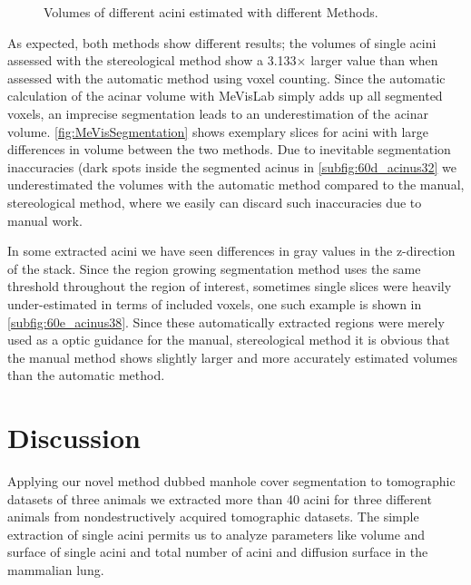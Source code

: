 \documentclass[twoside,paper=a4,abstract=true,english,DIV=calc]{scrartcl}
\newcommand{\difference}{3.133} %
\begin{document}
\begin{figure}[htb]
	\caption{Volumes of different acini estimated with different Methods.}
	\label{fig:VolumeMeVisVsSTEPanizer}%
\end{figure}

As expected, both methods show different results; the volumes of single acini assessed with the stereological method show a \difference\(\times\) larger value than when assessed with the automatic method using voxel counting. Since the automatic calculation of the acinar volume with MeVisLab simply adds up all segmented voxels, an imprecise segmentation leads to an underestimation of the acinar volume. \autoref{fig:MeVisSegmentation} shows exemplary slices for acini with large differences in volume between the two methods. Due to inevitable segmentation inaccuracies (dark spots inside the segmented acinus in \autoref{subfig:60d_acinus32} we underestimated the volumes with the automatic method compared to the manual, stereological method, where we easily can discard such inaccuracies due to manual work.

In some extracted acini we have seen differences in gray values in the z-direction of the stack. Since the region growing segmentation method uses the same threshold throughout the region of interest, sometimes single slices were heavily under-estimated in terms of included voxels, one such example is shown in \autoref{subfig:60e_acinus38}. Since these automatically extracted regions were merely used as a optic guidance for the manual, stereological method it is obvious that the manual method shows slightly larger and more accurately estimated volumes than the automatic method.

\section{Discussion}
Applying our novel method dubbed manhole cover segmentation to tomographic datasets of three animals we extracted more than 40 acini for three different animals from nondestructively acquired tomographic datasets. The simple extraction of single acini permits us to analyze parameters like volume and surface of single acini and total number of acini and diffusion surface in the mammalian lung.
\end{document}
